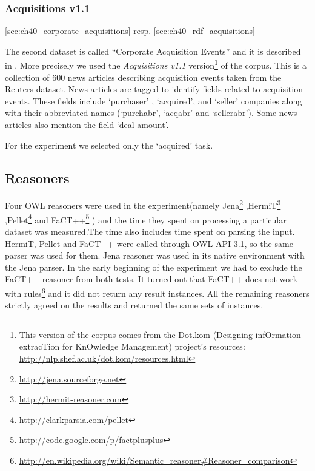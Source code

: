 \subsubsection{Acquisitions v1.1}  

\ref{sec:ch40_corporate_acquisitions} resp. \ref{sec:ch40_rdf_acquisitions}

The second dataset is called ``Corporate Acquisition Events'' and it is
described in \citep{lewis1992representation}. More precisely we used the \emph{Acquisitions v1.1} version\footnote{This version of the corpus comes from the Dot.kom (Designing infOrmation extracTion for KnOwledge Management) project's resources: \url{http://nlp.shef.ac.uk/dot.kom/resources.html}} of the corpus.
This is a collection of 600 news articles describing acquisition
events taken from the Reuters dataset. News articles are tagged to identify fields
related to acquisition events. These fields include `purchaser' , `acquired', and
`seller' companies along with their abbreviated names (`purchabr', `acqabr' and
`sellerabr'). Some news articles also mention the field `deal amount'.


For the experiment we selected only the `acquired' task.





\subsection{Reasoners}

Four OWL reasoners were used in the experiment(namely
Jena\footnote{\url{http://jena.sourceforge.net}}
,HermiT\footnote{\url{http://hermit-reasoner.com}}
,Pellet\footnote{\url{http://clarkparsia.com/pellet}}
and FaCT++\footnote{\url{http://code.google.com/p/factplusplus}}
) and the time they spent on processing a particular dataset was measured.The time also includes time spent on parsing the input. HermiT, Pellet and FaCT++ were called through OWL API-3.1, so the same parser was used for them. Jena reasoner was used in its native environment with the Jena parser.
In the early beginning of the experiment we had to exclude the FaCT++ reasoner from both tests. It turned out that FaCT++ does not work with rules\footnote{\url{http://en.wikipedia.org/wiki/Semantic_reasoner#Reasoner_comparison}} and it did not return any result instances.  All the remaining reasoners strictly agreed on the results and returned the same sets of instances.

